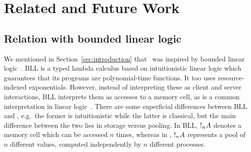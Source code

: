 \documentclass[a4paper,UKenglish]{lipics-v2016}
\begin{document}
\section{Related and Future Work}

\subsection*{Relation with bounded linear logic}
We mentioned in Section~\ref{sec:introduction} that \nodcap\ was inspired by
bounded linear logic~\cite[BLL]{girard1992}. BLL is a typed lambda calculus
based on intuitionistic linear logic which guarantees that its programs are
polynomial-time functions. 
It too uses resource-indexed exponentials. However, instead of interpreting
these as client and server interactions, BLL interprets them as accesses to a
memory cell, as is a common interpretation in linear logic~\cite{girard1987}.
There are some superficial differences between BLL and \nodcap, e.g.\ the former
is intuitionistic while the latter is classical, but the main difference between
the two lies in storage versus pooling. In BLL, $\take[n]{A}$ denotes a memory
cell which can be accessed $n$ times, whereas in \nodcap, $\take[n]{A}$
represents a pool of $n$ different values, computed independently by $n$
different processes.
\end{document}
